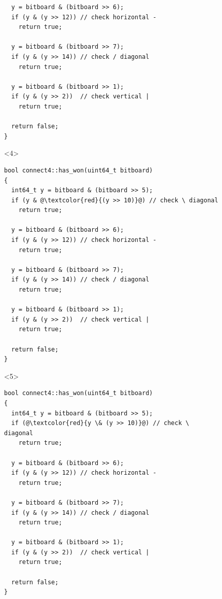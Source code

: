 \documentclass{beamer}
\begin{document}
\begin{frame}[fragile]
\begin{figure}
\begin{minipage}{0.5\textwidth}
\begin{onlyenv}
\begin{lstlisting}
  y = bitboard & (bitboard >> 6);
  if (y & (y >> 12)) // check horizontal -
    return true;

  y = bitboard & (bitboard >> 7);
  if (y & (y >> 14)) // check / diagonal
    return true;

  y = bitboard & (bitboard >> 1);
  if (y & (y >> 2))  // check vertical |
    return true;

  return false;
}
\end{lstlisting}
\end{onlyenv}
\begin{onlyenv}<4>
\begin{lstlisting}
bool connect4::has_won(uint64_t bitboard)
{
  int64_t y = bitboard & (bitboard >> 5);
  if (y & @\textcolor{red}{(y >> 10)}@) // check \ diagonal
    return true;

  y = bitboard & (bitboard >> 6);
  if (y & (y >> 12)) // check horizontal -
    return true;

  y = bitboard & (bitboard >> 7);
  if (y & (y >> 14)) // check / diagonal
    return true;

  y = bitboard & (bitboard >> 1);
  if (y & (y >> 2))  // check vertical |
    return true;

  return false;
}
\end{lstlisting}
\end{onlyenv}
\begin{onlyenv}<5>
\begin{lstlisting}
bool connect4::has_won(uint64_t bitboard)
{
  int64_t y = bitboard & (bitboard >> 5);
  if (@\textcolor{red}{y \& (y >> 10)}@) // check \ diagonal
    return true;

  y = bitboard & (bitboard >> 6);
  if (y & (y >> 12)) // check horizontal -
    return true;

  y = bitboard & (bitboard >> 7);
  if (y & (y >> 14)) // check / diagonal
    return true;

  y = bitboard & (bitboard >> 1);
  if (y & (y >> 2))  // check vertical |
    return true;

  return false;
}
\end{lstlisting}
\end{onlyenv}

\end{minipage}
\end{figure}

\end{frame}
\end{document}
